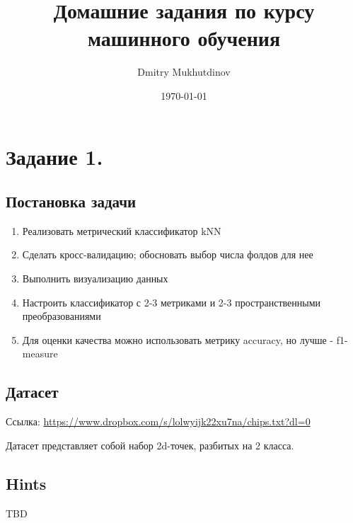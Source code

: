 \documentclass[11pt]{article}
\author{Dmitry Mukhutdinov}
\date{\today}
\title{Домашние задания по курсу машинного обучения}
\begin{document}
\maketitle
\tableofcontents


\section{Задание 1.}
\label{sec:orgheadline6}
\subsection{Постановка задачи}
\label{sec:orgheadline1}
\begin{enumerate}
\item Реализовать метрический классификатор kNN
\item Сделать кросс-валидацию; обосновать выбор числа фолдов для нее
\item Выполнить визуализацию данных
\item Настроить классификатор с 2-3 метриками и 2-3 пространственными преобразованиями
\item Для оценки качества можно использовать метрику accuracy, но лучше - f1-measure
\end{enumerate}
\subsection{Датасет}
\label{sec:orgheadline2}
Ссылка: \url{https://www.dropbox.com/s/lolwyijk22xu7na/chips.txt?dl=0}

Датасет представляет собой набор 2d-точек, разбитых на 2 класса.
\subsection{Hints}
\label{sec:orgheadline3}
TBD
\end{document}
